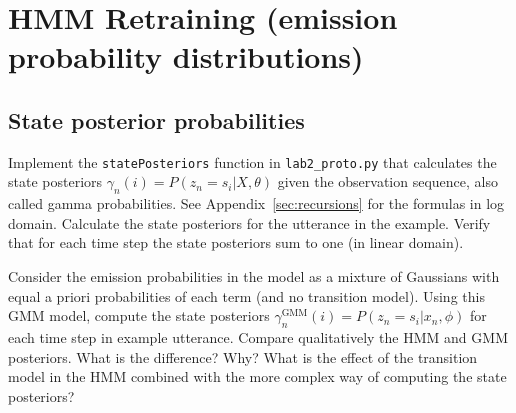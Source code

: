 \documentclass{nada-ten}
\begin{document}

\section{HMM Retraining (emission probability distributions)}

\subsection{State posterior probabilities}
Implement the \texttt{statePosteriors} function in \texttt{lab2\_proto.py} that calculates the state posteriors $\gamma_n(i) = P(z_n=s_i|X,\theta)$ given the observation sequence, also called gamma probabilities. See Appendix~\ref{sec:recursions} for the formulas in log domain. Calculate the state posteriors for the utterance in the example. Verify that for each time step the state posteriors sum to one (in linear domain).

Consider the emission probabilities in the model as a mixture of Gaussians with equal a priori probabilities of each term (and no transition model). Using this GMM model, compute the state posteriors $\gamma^{\text{GMM}}_n(i) = P(z_n=s_i|x_n,\phi)$ for each time step in example utterance.
Compare qualitatively the HMM and GMM posteriors. What is the difference? Why? What is the effect of the transition model in the HMM combined with the more complex way of computing the state posteriors?
\end{document}
